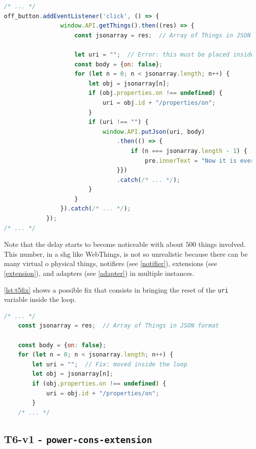 \begin{lstlisting}[language=JavaScript, label=lst:t5loop, caption=T5 - Loop in charge of turning things off]
/* ... */
off_button.addEventListener('click', () => {
                window.API.getThings().then((res) => {
                    const jsonarray = res;  // Array of Things in JSON format

                    let uri = "";  // Error: this must be placed inside the loop
                    const body = {on: false};
                    for (let n = 0; n < jsonarray.length; n++) {
                        let obj = jsonarray[n];
                        if (obj.properties.on !== undefined) { 
                            uri = obj.id + "/properties/on";
                        }
                        if (uri !== "") {
                            window.API.putJson(uri, body)
                                .then(() => {
                                    if (n === jsonarray.length - 1) {
                                        pre.innerText = "Now it is everything off";
                                }})
                                .catch(/* ... */);
                        }
                    }
                }).catch(/* ... */);
            });
/* ... */


\end{lstlisting}

Note that the delay starts to become noticeable with about $500$ things involved. This number, in a \gls{shg} like WebThings, is not so unrealistic because there can be many virtual o physical things, notifiers (see \autoref{notifier}), extensions (see \autoref{extension}), and adapters (see \autoref{adapter}) in multiple instances.

\autoref{lst:t5fix} shows a possible fix that consists in bringing the reset of the  \texttt{uri} variable inside the loop.

\begin{lstlisting}[language=JavaScript, label=lst:t5fix, caption=T5 - Fix]
    /* ... */
    const jsonarray = res;  // Array of Things in JSON format

    const body = {on: false};
    for (let n = 0; n < jsonarray.length; n++) {
        let uri = "";  // Fix: moved inside the loop
        let obj = jsonarray[n];
        if (obj.properties.on !== undefined) { 
            uri = obj.id + "/properties/on";
        }
    /* ... */
\end{lstlisting}


\subsection{T6-v1 - \texttt{power-cons-extension}}
\label{t61poc}

